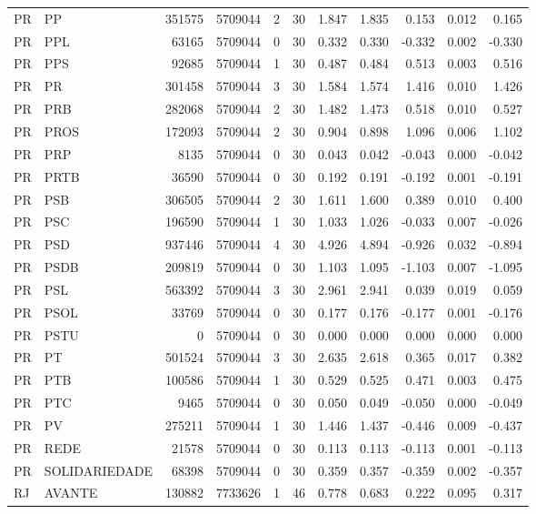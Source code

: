 \begin{landscape}
\begin{longtable}{llrrrrrrrrr}
PR & PP & 351575 & 5709044 & 2 & 30 & 1.847 & 1.835 & 0.153 & 0.012 & 0.165 \\
PR & PPL & 63165 & 5709044 & 0 & 30 & 0.332 & 0.330 & -0.332 & 0.002 & -0.330 \\
PR & PPS & 92685 & 5709044 & 1 & 30 & 0.487 & 0.484 & 0.513 & 0.003 & 0.516 \\
PR & PR & 301458 & 5709044 & 3 & 30 & 1.584 & 1.574 & 1.416 & 0.010 & 1.426 \\
PR & PRB & 282068 & 5709044 & 2 & 30 & 1.482 & 1.473 & 0.518 & 0.010 & 0.527 \\
PR & PROS & 172093 & 5709044 & 2 & 30 & 0.904 & 0.898 & 1.096 & 0.006 & 1.102 \\
PR & PRP & 8135 & 5709044 & 0 & 30 & 0.043 & 0.042 & -0.043 & 0.000 & -0.042 \\
PR & PRTB & 36590 & 5709044 & 0 & 30 & 0.192 & 0.191 & -0.192 & 0.001 & -0.191 \\
PR & PSB & 306505 & 5709044 & 2 & 30 & 1.611 & 1.600 & 0.389 & 0.010 & 0.400 \\
PR & PSC & 196590 & 5709044 & 1 & 30 & 1.033 & 1.026 & -0.033 & 0.007 & -0.026 \\
PR & PSD & 937446 & 5709044 & 4 & 30 & 4.926 & 4.894 & -0.926 & 0.032 & -0.894 \\
PR & PSDB & 209819 & 5709044 & 0 & 30 & 1.103 & 1.095 & -1.103 & 0.007 & -1.095 \\
PR & PSL & 563392 & 5709044 & 3 & 30 & 2.961 & 2.941 & 0.039 & 0.019 & 0.059 \\
PR & PSOL & 33769 & 5709044 & 0 & 30 & 0.177 & 0.176 & -0.177 & 0.001 & -0.176 \\
PR & PSTU & 0 & 5709044 & 0 & 30 & 0.000 & 0.000 & 0.000 & 0.000 & 0.000 \\
PR & PT & 501524 & 5709044 & 3 & 30 & 2.635 & 2.618 & 0.365 & 0.017 & 0.382 \\
PR & PTB & 100586 & 5709044 & 1 & 30 & 0.529 & 0.525 & 0.471 & 0.003 & 0.475 \\
PR & PTC & 9465 & 5709044 & 0 & 30 & 0.050 & 0.049 & -0.050 & 0.000 & -0.049 \\
PR & PV & 275211 & 5709044 & 1 & 30 & 1.446 & 1.437 & -0.446 & 0.009 & -0.437 \\
PR & REDE & 21578 & 5709044 & 0 & 30 & 0.113 & 0.113 & -0.113 & 0.001 & -0.113 \\
PR & SOLIDARIEDADE & 68398 & 5709044 & 0 & 30 & 0.359 & 0.357 & -0.359 & 0.002 & -0.357 \\
RJ & AVANTE & 130882 & 7733626 & 1 & 46 & 0.778 & 0.683 & 0.222 & 0.095 & 0.317 \\

\end{longtable}
\end{landscape}
